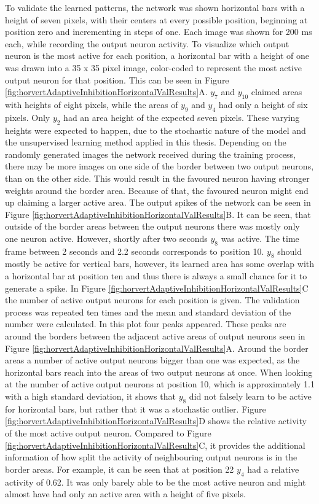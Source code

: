 To validate the learned patterns, the network was shown horizontal bars with a height of seven pixels, with their centers at every possible position, beginning at position zero and incrementing in steps of one. Each image was shown for 200 ms each, while recording the output neuron activity. To visualize which output neuron is the most active for each position, a horizontal bar with a height of one was drawn into a 35 x 35 pixel image, color-coded to represent the most active output neuron for that position. This can be seen in Figure \ref{fig:horvertAdaptiveInhibitionHorizontalValResults}A. $y_7$ and $y_{10}$ claimed areas with heights of eight pixels, while the areas of $y_9$ and $y_4$ had only a height of six pixels. Only $y_2$ had an area height of the expected seven pixels. These varying heights were expected to happen, due to the stochastic nature of the model and the unsupervised learning method applied in this thesis. Depending on the randomly generated images the network received during the training process, there may be more images on one side of the border between two output neurons, than on the other side. This would result in the favoured neuron having stronger weights around the border area. Because of that, the favoured neuron might end up claiming a larger active area.
The output spikes of the network can be seen in Figure  \ref{fig:horvertAdaptiveInhibitionHorizontalValResults}B. It can be seen, that outside of the border areas between the output neurons there was mostly only one neuron active. However, shortly after two seconds $y_8$ was active. The time frame between 2 seconds and 2.2 seconds corresponds to position 10. $y_8$ should mostly be active for vertical bars, however, its learned area has some overlap with a horizontal bar at position ten and thus there is always a small chance for it to generate a spike. 
In Figure \ref{fig:horvertAdaptiveInhibitionHorizontalValResults}C the number of active output neurons for each position is given.  The validation process was repeated ten times and the mean and standard deviation of the number were calculated. In this plot four peaks appeared. These peaks are around the borders between the adjacent active areas of output neurons seen in Figure \ref{fig:horvertAdaptiveInhibitionHorizontalValResults}A. Around the border areas a number of active output neurons bigger than one was expected, as the horizontal bars reach into the areas of two output neurons at once. When looking at the number of active output neurons at position 10, which is approximately 1.1 with a high standard deviation, it shows that $y_8$ did not falsely learn to be active for horizontal bars, but rather that it was a stochastic outlier. Figure \ref{fig:horvertAdaptiveInhibitionHorizontalValResults}D shows the relative activity of the most active output neuron. Compared to Figure \ref{fig:horvertAdaptiveInhibitionHorizontalValResults}C, it provides the additional information of how split the activity of neighbouring output neurons is in the border areas. For example, it can be seen that at position 22 $y_4$ had a relative activity of 0.62. It was only barely able to be the most active neuron and might almost have had only an active area with a height of five pixels.

